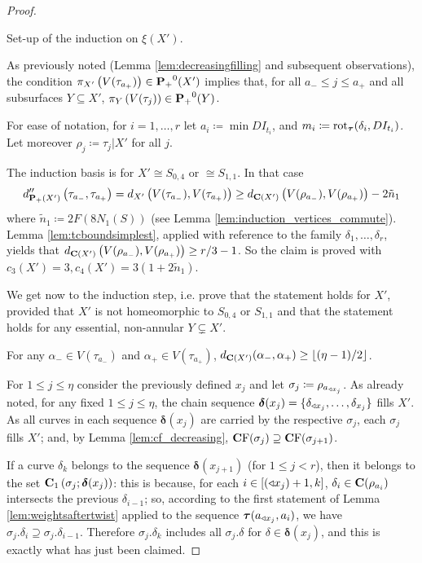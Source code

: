 \begin{proof}\label{prf:tcbound}

 Set-up of the induction on $\xi(X')$.

As previously noted (Lemma \ref{lem:decreasingfilling} and subsequent observations), the condition $\pi_{X'}\left(V(\tau_{a_+})\right) \in {\mathbf{P}_+}^0(X')$ implies that, for all $a_-\leq j\leq a_+$ and all subsurfaces $Y\subseteq X'$, $\pi_Y\left(V(\tau_j)\right) \in {\mathbf{P}_+}^0(Y)$.

For ease of notation, for $i=1,\ldots,r$ let $a_i \coloneqq\min DI_{t_i}$, %
and $m_i\coloneqq\mathrm{rot}_{\bm\tau}(\delta_i,DI_{t_i})$. Let moreover $\rho_j\coloneqq \tau_j|X'$ for all $j$.

The induction basis is for $X'\cong S_{0,4}$ or $\cong S_{1,1}$. In that case 
$$d''_{{\mathbf{P}_+}(X')}\left(\tau_{a_-},\tau_{a_+}\right)=d_{X'}\left(V(\tau_{a_-}),V(\tau_{a_+})\right)\geq d_{\mathbf C(X')}\left(V(\rho_{a_-}),V(\rho_{a_+})\right)-2\tilde n_1$$
where $\tilde n_1\coloneqq 2F(8 N_1(S))$ (see Lemma \ref{lem:induction_vertices_commute}). Lemma \ref{lem:tcboundsimplest}, applied with reference to the family $\delta_1,\ldots,\delta_r$, yields that $d_{\mathbf C(X')}\left(V(\rho_{a_-}),V(\rho_{a_+})\right) \geq r/3-1$. So the claim is proved with $c_3(X')= 3, c_4(X') = 3(1+2\tilde n_1)$.

We get now to the induction step, i.e. prove that the statement holds for $X'$, provided that $X'$ is not homeomorphic to $S_{0,4}$ or $S_{1,1}$ and that the statement holds for any essential, non-annular $Y\subsetneq X'$.

 For any $\alpha_-\in V(\tau_{a_-})$ and $\alpha_+\in V(\tau_{a_+})$, $d_{\mathbf C({X'})}(\alpha_-,\alpha_+)\geq \lfloor (\eta-1)/2\rfloor$.

For $1\leq j \leq \eta$ consider the previously defined $x_j$ and let $\sigma_j\coloneqq\rho_{a_{\triangleleft x_j}}$. As already noted, for any fixed $1\leq j \leq \eta$, the chain sequence $\bm\delta(x_j)= \{\delta_{\triangleleft x_j},\ldots,\delta_{x_j}\}$ fills $X'$. As all curves in each sequence $\bm\delta(x_j)$ are carried by the respective $\sigma_j$, each $\sigma_j$ fills $X'$; and, by Lemma \ref{lem:cf_decreasing}, $\mathbf C \mathrm F(\sigma_j)\supseteq \mathbf C \mathrm F(\sigma_{j+1})$.

If a curve $\delta_k$ belongs to the sequence $\bm\delta(x_{j+1})$ (for $1\leq j<r$), then it belongs to the set $\mathbf C_1\left(\sigma_j;\bm\delta(x_j)\right)$: this is because, for each $i \in [(\triangleleft x_j)+1, k]$, $\delta_i\in \mathbf C(\rho_{a_i})$ intersects the previous $\delta_{i-1}$; so, according to the first statement of Lemma \ref{lem:weightsaftertwist} applied to the sequence $\bm\tau(a_{\triangleleft x_j}, a_i)$, we have $\sigma_j.\delta_i\supseteq \sigma_j.\delta_{i-1}$. Therefore $\sigma_j.\delta_k$ includes all $\sigma_j.\delta$ for $\delta\in \bm\delta(x_j)$, and this is exactly what has just been claimed.


\end{proof}

